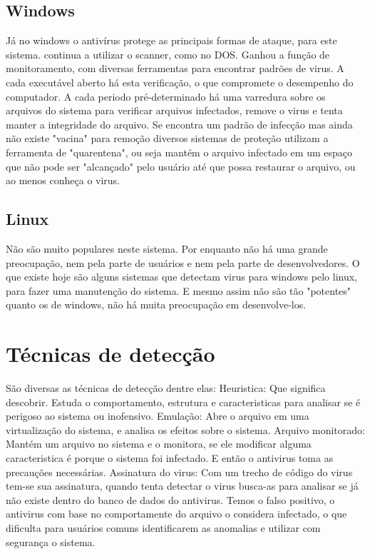 \subsection{Windows}
Já no windows o antivírus protege as principais formas de ataque, para este sistema. 
continua a utilizar o scanner, como no DOS. 
Ganhou a função de monitoramento, com diversas ferramentas para encontrar padrões de virus. 
   A cada executável aberto há esta verificação, o que compromete o desempenho do computador.
A cada periodo pré-determinado há uma varredura sobre os arquivos do sistema para verificar arquivos infectados, remove o virus e tenta manter a integridade do arquivo.
Se encontra um padrão de infecção mas ainda não existe "vacina" para remoção diversos sistemas de proteção utilizam a ferramenta de "quarentena", ou seja mantém o arquivo infectado em um espaço que não pode ser "alcançado" pelo usuário até que possa restaurar o arquivo, ou ao menos conheça o virus.

\subsection{Linux}
Não são muito populares neste sistema. Por enquanto não há uma grande preocupação, nem pela parte de usuários e nem pela parte de desenvolvedores. O que existe hoje são alguns sistemas que detectam virus para windows pelo linux, para fazer uma manutenção do sistema. E mesmo assim não são tão "potentes" quanto os de windows, não há muita preocupação em desenvolve-los.


\section{Técnicas de detecção}
São diversas as técnicas de detecção dentre elas:
Heuristica: Que significa descobrir. Estuda o comportamento, estrutura e caracteristicas para analisar se é perigoso ao sistema ou inofensivo.
Emulação: Abre o arquivo em uma virtualização do sistema, e analisa os efeitos sobre o sistema.
Arquivo monitorado: Mantém um arquivo no sistema e o monitora, se ele modificar alguma caracteristica é porque o sistema foi infectado. E então o antivirus toma as precauções necessárias.
Assinatura do virus: Com um trecho de código do virus tem-se sua assinatura, quando tenta detectar o virus busca-as para analisar se já não existe dentro do banco de dados do antivirus.
Temos o falso positivo, o antivirus com base no comportamente do arquivo o considera infectado, o que dificulta para usuários comuns identificarem as anomalias e utilizar com segurança o sistema.

